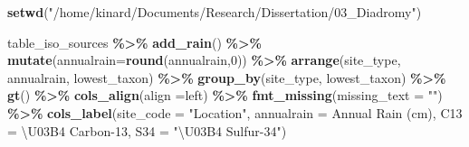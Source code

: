 \documentclass[
]{article}
\newenvironment{Shaded}{\begin{snugshade}}{\end{snugshade}}
\newcommand{\AttributeTok}[1]{\textcolor[rgb]{0.13,0.29,0.53}{#1}}
\newcommand{\DecValTok}[1]{\textcolor[rgb]{0.00,0.00,0.81}{#1}}
\newcommand{\FunctionTok}[1]{\textcolor[rgb]{0.13,0.29,0.53}{\textbf{#1}}}
\newcommand{\NormalTok}[1]{#1}
\newcommand{\SpecialCharTok}[1]{\textcolor[rgb]{0.81,0.36,0.00}{\textbf{#1}}}
\newcommand{\StringTok}[1]{\textcolor[rgb]{0.31,0.60,0.02}{#1}}
\begin{document}
\begin{Shaded}
\begin{Highlighting}[]
\FunctionTok{setwd}\NormalTok{(}\StringTok{"/home/kinard/Documents/Research/Dissertation/03\_Diadromy"}\NormalTok{)}

\NormalTok{table\_iso\_sources }\SpecialCharTok{\%\textgreater{}\%}
  \FunctionTok{add\_rain}\NormalTok{() }\SpecialCharTok{\%\textgreater{}\%}
  \FunctionTok{mutate}\NormalTok{(}\AttributeTok{annualrain=}\FunctionTok{round}\NormalTok{(annualrain,}\DecValTok{0}\NormalTok{)) }\SpecialCharTok{\%\textgreater{}\%}
  \FunctionTok{arrange}\NormalTok{(site\_type, annualrain, lowest\_taxon) }\SpecialCharTok{\%\textgreater{}\%}
  \FunctionTok{group\_by}\NormalTok{(site\_type, lowest\_taxon) }\SpecialCharTok{\%\textgreater{}\%}
  \FunctionTok{gt}\NormalTok{() }\SpecialCharTok{\%\textgreater{}\%}
  \FunctionTok{cols\_align}\NormalTok{(}\AttributeTok{align =}\StringTok{\textquotesingle{}left\textquotesingle{}}\NormalTok{) }\SpecialCharTok{\%\textgreater{}\%}
  \FunctionTok{fmt\_missing}\NormalTok{(}\AttributeTok{missing\_text =} \StringTok{""}\NormalTok{) }\SpecialCharTok{\%\textgreater{}\%} 
  \FunctionTok{cols\_label}\NormalTok{(}\AttributeTok{site\_code =} \StringTok{"Location"}\NormalTok{,}
             \AttributeTok{annualrain =} \StringTok{\textquotesingle{}Annual Rain (cm)\textquotesingle{}}\NormalTok{,}
             \AttributeTok{C13 =} \StringTok{\textquotesingle{}\textbackslash{}U03B4 Carbon{-}13\textquotesingle{}}\NormalTok{,}
             \AttributeTok{S34 =} \StringTok{"\textbackslash{}U03B4 Sulfur{-}34"}\NormalTok{)}
\end{Highlighting}
\end{Shaded}
\end{document}
